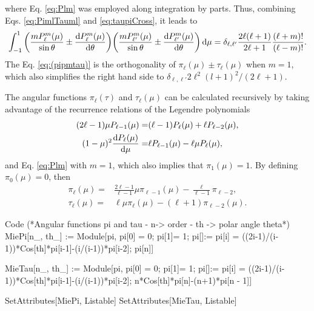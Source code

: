 %
where Eq. \eqref{eq:Plm} was employed along integration by parts. Thus, combining Eqs. \eqref{eq:PimlTauml} and \eqref{eq:taupiCross}, it leads to
%
\begin{align}
\int_{-1}^{1}\qty(\frac{mP_\ell^m(\mu)}{\sin\theta}\pm\dv{P_\ell^m(\mu)}{\theta})\qty(\frac{mP_{\ell'}^m(\mu)}{\sin\theta}\pm\dv{P_{\ell'}^m(\mu)}{\theta})\dd{\mu}  
 =  \delta_{\ell,\ell'}\frac{2\ell(\ell+1)}{2\ell+1}\frac{(\ell+m)!}{(\ell-m)!}.
 \label{eq:(pipmtau)}
\end{align}
%
The Eq. \eqref{eq:(pipmtau)}  is the orthogonality of $\pi_\ell(\mu)\pm\tau_\ell(\mu)$ when $m = 1$, which also simplifies the right hand side to $\delta_{\ell,\ell'} 2\ell^2(l+1)^2/(2\ell+1)$.

The angular functions $\pi_\ell(\tau)$ and $\tau_\ell(\mu)$ can be calculated recursively by taking advantage of the  recurrence relations of the Legendre polynomials \cite{arfken_mathematical_2001}
%
\begin{align}
(2\ell-1)\mu P_{\ell-1}(\mu) =& (\ell-1) P_{\ell}(\mu) + \ell P_{\ell-2}(\mu),\\
(1-\mu)^2\dv{P_\ell(\mu)}{\mu} =& \ell P_{\ell-1}(\mu) - \ell\mu P_\ell(\mu),
\end{align}
%
and Eq. \eqref{eq:Plm} with $m=1$, which also implies that  $\pi_1(\mu) = 1$. By defining $\pi_0(\mu)=0$, then
%
\begin{align}
\pi_\ell(\mu) =& \frac{2\ell-1}{\ell-1}\mu \pi_{\ell-1}(\mu) - \frac{\ell}{\ell-1}\pi_{\ell-2},\\
\tau_ \ell (\mu) =& \ell\mu\pi_\ell(\mu) - (\ell+1)\pi_{\ell-2}(\mu).
\end{align}
%

\begin{mmaCell}[
	pattern = {n, th,n_,th_},
	local = {pi}
	]{Code}
  (*Angular functions pi and tau - n-> order - th -> polar angle theta*)
  MiePi[n_, th_] := Module[{pi}, 
     pi[0] = 0; pi[1]= 1;  
     pi[]:= pi[i] = ((2i-1)/(i-1))*Cos[th]*pi[i-1]-(i/(i-1))*pi[i-2]; 
    pi[n]]
     
  MieTau[n_, th_] := Module[{pi}, 
     pi[0] = 0; pi[1]= 1;  
     pi[]:= pi[i] = ((2i-1)/(i-1))*Cos[th]*pi[i-1]-(i/(i-1))*pi[i-2]; 
    n*Cos[th]*pi[n]-(n+1)*pi[n - 1]]

		SetAttributes[MiePi, Listable]
		SetAttributes[MieTau, Listable]
\end{mmaCell}

